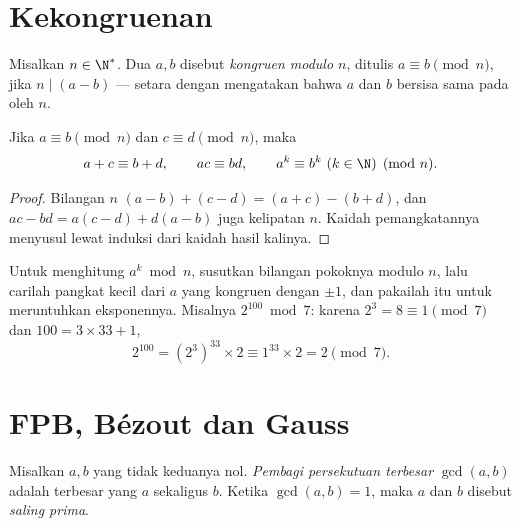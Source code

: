 \section{Kekongruenan}

\begin{definition}[Kekongruenan]\label{def:g12:arith:congruence}
Misalkan $n \in \N^*$. Dua  $a, b$ disebut \emph{kongruen modulo
$n$}, ditulis $a \equiv b \pmod n$, jika $n \mid (a - b)$
--- setara dengan mengatakan bahwa $a$ dan $b$ bersisa sama pada  oleh $n$.
\end{definition}

\begin{proposition}\label{prop:g12:arith:congops}
Jika $a \equiv b \pmod n$ dan $c \equiv d \pmod n$, maka
\[
a + c \equiv b + d, \qquad
ac \equiv bd, \qquad
a^k \equiv b^k \ (k \in \N) \pmod n .
\]
\end{proposition}

\begin{proof}
Bilangan $n$  $(a-b) + (c-d) = (a+c) - (b+d)$, dan
$ac - bd = a(c - d) + d(a - b)$ juga kelipatan $n$. Kaidah pemangkatannya
menyusul lewat induksi dari kaidah hasil kalinya.
\end{proof}

\begin{method}\label{met:g12:arith:powers}
Untuk menghitung $a^k \bmod n$, susutkan bilangan pokoknya modulo $n$, lalu carilah
pangkat kecil dari $a$ yang kongruen dengan $\pm1$, dan pakailah itu untuk
meruntuhkan eksponennya. Misalnya $2^{100} \bmod 7$: karena $2^3 = 8 \equiv 1 \pmod 7$
dan $100 = 3\times33 + 1$,
\[
2^{100} = \left(2^{3}\right)^{33} \times 2 \equiv 1^{33}\times 2 = 2 \pmod 7 .
\]
\end{method}

\section{FPB, Bézout dan Gauss}

\begin{definition}\label{def:g12:arith:gcd}
Misalkan $a, b$  yang tidak keduanya nol. \emph{Pembagi persekutuan
terbesar} $\gcd(a, b)$ adalah 
terbesar yang  $a$ sekaligus $b$. Ketika $\gcd(a,b) = 1$, maka $a$ dan $b$
disebut \emph{saling prima}.
\end{definition}

